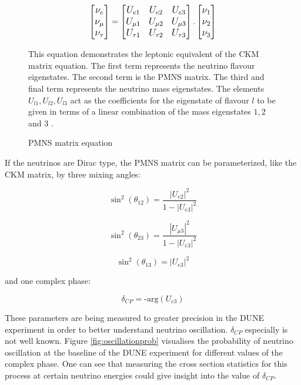 \documentclass[10pt]{article}
\begin{document}
\begin{figure}
	\begin{equation*}
	\large
	\begin{bmatrix}
	\nu_e \\
	\nu_{\mu} \\
	\nu_{\tau} \\
	\end{bmatrix}
	=
	\begin{bmatrix}
	U_{e1} & U_{e2} & U_{e3} \\
	U_{\mu 1} & U_{\mu 2} & U_{\mu 3} \\
	U_{\tau 1} & U_{\tau 2} & U_{\tau 3} \\
	\end{bmatrix}
	.
	\begin{bmatrix}
	\nu_1 \\
	\nu_2 \\
	\nu_3 \\
	\end{bmatrix}
	\end{equation*}
	\caption{PMNS matrix equation}{This equation demonstrates the leptonic equivalent of the CKM matrix equation. The first term represents the neutrino flavour eigenstates. The second term is the PMNS matrix. The third and final term represents the neutrino mass eigenstates. The elements $U_{l1}, U_{l2}, U_{l3}$ act as the coefficients for the eigenstate of flavour $l$ to be given in terms of a linear combination of the mass eigenstates $1, 2$ and $3$ \cite{abi2020deep}.}
	\label{PMNS_eq}
\end{figure}

If the neutrinos are Dirac type, the PMNS matrix can be parameterized, like the CKM matrix, by three mixing angles:

$$
	\sin^2(\theta_{12}) = \frac{|U_{e2}|^2}{1-|U_{e3}|^2}
$$

$$
	\sin^2(\theta_{23}) = \frac{|U_{\mu 3}|^2}{1-|U_{e3}|^2}
$$

$$	
	\sin^2(\theta_{13}) = |U_{e3}|^2
$$

and one complex phase:

$$
	\delta_{CP} = \text{-arg}(U_{e3})
$$
 
These parameters are being measured to greater precision in the DUNE experiment in order to better understand neutrino oscillation. $\delta_{CP}$ especially is not well known. Figure \ref{fig:oscillationprob} visualises the probability of neutrino oscillation at the baseline of the DUNE experiment for different values of the complex phase. One can see that measuring the cross section statistics for this process at certain neutrino energies could give insight into the value of $\delta_{CP}$.
\end{document}
